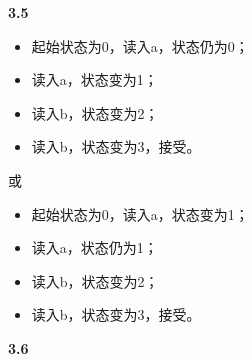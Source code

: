 \documentclass[UTF8]{report}
\newcommand{\tbf}[1]{\textbf{#1}}
\begin{document}
\noindent
\tbf{3.5}

\begin{itemize}
    \item 起始状态为0，读入a，状态仍为0；
    \item 读入a，状态变为1；
    \item 读入b，状态变为2；
    \item 读入b，状态变为3，接受。
\end{itemize}
或
\begin{itemize}
    \item 起始状态为0，读入a，状态变为1；
    \item 读入a，状态仍为1；
    \item 读入b，状态变为2；
    \item 读入b，状态变为3，接受。
\end{itemize}

\noindent
\tbf{3.6}
\end{document}
